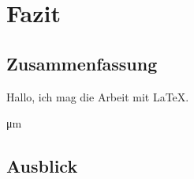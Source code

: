 \chapter{Fazit}\label{cha:fazit}
\section{Zusammenfassung}

\cite{kohm:2018} \citeyear{kohm:2018}

\blindtext[1] Hallo, ich mag die Arbeit mit \LaTeX.

\si{\micro\meter}

\blindtext[1]

\blindtext[1]

\blindtext[1]

\blindtext[2]


\section{Ausblick}

\blindtext[5]
